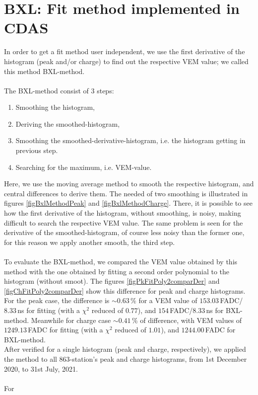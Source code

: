 \documentclass[twoside, final, 10pt]{articleMine}
\begin{document}
\section{BXL: Fit method implemented in CDAS}
In order to get a fit method user independent, we use the first
derivative of the histogram (peak and/or charge) to find out the
respective VEM value; we called this method BXL-method.\\\\The
BXL-method consist of 3 steps:
\begin{enumerate}
  \item Smoothing the histogram,
  \item Deriving the smoothed-histogram,
  \item Smoothing the smoothed-derivative-histogram, i.e. the
    histogram getting in previous step.
  \item Searching for the maximum, i.e. VEM-value.
\end{enumerate}
Here, we use the moving average method to smooth the respective
histogram, and central differences to derive them. The needed of
two smoothing is illustrated in figures \ref{figBxlMethodPeak}
and \ref{figBxlMethodCharge}. There, it is possible to see how
the first derivative of the histogram, without smoothing, is
noisy, making difficult to search the respective VEM value. The
same problem is seen for the derivative of the
smoothed-histogram, of course less noisy than the former one, for
this reason we apply another smooth, the third step.\\\\To
evaluate the BXL-method, we compared the VEM value obtained by
this method with the one obtained by fitting a second order
polynomial to the histogram (without smoot). The figures
\ref{figPkFitPoly2comparDer} and \ref{figChFitPoly2comparDer}
show this difference for peak and charge histograms. For the peak
case, the difference is $\sim0.63$\,\% for a VEM value of
$153.03$\,FADC/$8.33$\,ns for fitting (with a $\chi^2$ reduced of
$0.77$), and $154$\,FADC/$8.33$\,ns for BXL-method. Meanwhile for
charge case $\sim0.41$\,\% of difference, with VEM values of
$1249.13$\,FADC for fitting (with a $\chi^2$ reduced of
$1.01$), and $1244.00$\,FADC for BXL-method.\\After verified
for a single histogram (peak and charge, respectively), we
applied the method to all 863-station's peak and charge
histograms, from 1st December 2020, to 31st July, 2021.\\\\For
\end{document}
